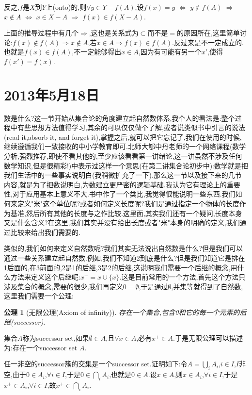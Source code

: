 \documentclass[12pt,a4paper,openany]{book}
\newtheorem{axiom}{公理}[section]
\begin{document}
反之,$f$是$X$到$Y$上(onto)的,则$\forall y \in Y-f(A)$,设$f(x)=y$ $\Leftrightarrow$ $y \notin f(A)$ $\Rightarrow$ $x \notin A$ $\Leftrightarrow$ $x \in X-A$ $\Rightarrow$ $f(x) \in f(X-A)$.

上面的推导过程中有几个$\Rightarrow$,这也是关系式为$\subset$而不是$=$的原因所在,这里简单讨论:$f(x) \notin f(A) \Rightarrow x \notin A$,若$x \in A \Rightarrow f(x) \in f(A)$.反过来是不一定成立的.也就是$f(x) \in f(A)$,不一定能够得出$x \in A$,因为有可能有另一个$x'$,使得$f(x')=f(x)$.

\section{2013年5月18日}
数是什么?这一节开始从集合论的角度建立起自然数体系,我个人的看法是:整个过程中有些思想方法值得学习,其余的可以仅仅做个了解,或者说类似书中引言的说法(read it,absorb it, and forget it),掌握之后,就可以把它忘记了,我们在使用的时候,继续遵循我们一致接收的中小学教育即可.北师大郇中丹老师的一个网络课程(数学分析,强烈推荐,即使不看其他的,至少应该看看第一讲绪论,这一讲虽然不涉及任何数学知识,但是很精彩!)中表示过这样一个意思(在第二讲集合论初步中):数学就是把我们生活中的一些事实说明白(我稍微扩充了一下).那么这一节以及接下来的几节内容,就是为了把数说明白,为数建立更严密的逻辑基础.我认为它有理论上的重要性,对于应用基本上意义不大.书中作了一个类比,我觉得很能说明一些东西.我们如何来定义"米"这个单位呢?或者如何定义长度呢?我们是通过指定一个物体的长度作为基准,然后所有其他的长度与之作比较.这里面,其实我们还有一个疑问,长度本身又是什么含义?在这里,我们其实并没有给出长度或者"米"本身的明确的定义,我们通过比较来给出我们需要的.

类似的,我们如何来定义自然数呢?我们其实无法说出自然数是什么?但是我们可以通过一些关系建立起自然数.例如,我们不知道2到底是什么?但是我们知道它是排在1后面的,在3前面的,2是1的后继,3是2的后继,这说明我们需要一个后继的概念,用什么方法来定义这个后继呢:$x^+=x \cup \{x\}$.这是目前常用的一个方法,首先这个方法只涉及集合的概念,需要的很少,我们再定义$0=\emptyset$,于是通过$\emptyset$,并集等就得到了自然数,这里我们需要一个公理:

\begin{axiom}[无限公理(Axiom of infinity)]
存在一个集合,包含0和它的每一个元素的后继(successor).
\end{axiom}

集合$A$称为successor set,如果$\emptyset \in A$,且$\forall x \in A$,必有$x^+ \in A$.于是无限公理可以描述为:存在一个successor set $A$.

任一非空的successor簇的交集是一个successor set.证明如下:令$A=\bigcup_{i}{A_i}$,$i \in I$,$I$非空,由于$0 \in A_i$,$\forall i \in I$,于是$0 \in \bigcap_{i}{A_i}$,也就是$0 \in A$.设$x \in A$,则$x \in A_i$,$\forall i \in I$,于是$x^+ \in A_i$,$\forall i \in I$,故$x^+ \in \bigcap_{i}{A_i}$.
\end{document}
